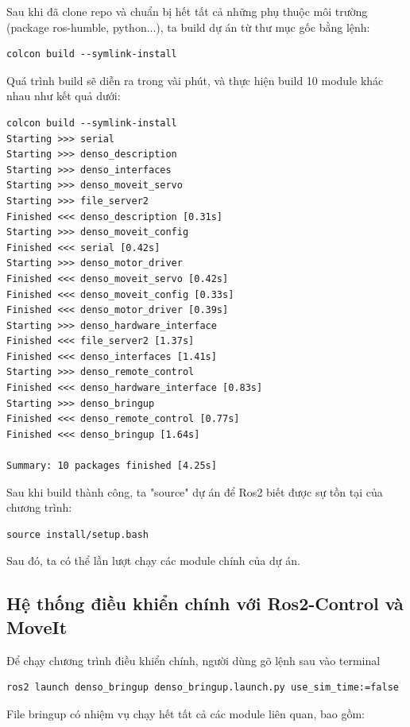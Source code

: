 Sau khi đã clone repo và chuẩn bị hết tất cả những phụ thuộc môi trường (package ros-humble, python...), ta build dự án từ thư mục gốc bằng lệnh:

\begin{lstlisting}[style=bashstyle]
colcon build --symlink-install
\end{lstlisting}

Quá trình build sẽ diễn ra trong vài phút, và thực hiện build 10 module khác nhau như kết quả dưới:

\begin{lstlisting}[style=bashstyle]
colcon build --symlink-install
Starting >>> serial
Starting >>> denso_description
Starting >>> denso_interfaces
Starting >>> denso_moveit_servo
Starting >>> file_server2
Finished <<< denso_description [0.31s]
Starting >>> denso_moveit_config
Finished <<< serial [0.42s]
Starting >>> denso_motor_driver
Finished <<< denso_moveit_servo [0.42s]
Finished <<< denso_moveit_config [0.33s]
Finished <<< denso_motor_driver [0.39s]
Starting >>> denso_hardware_interface
Finished <<< file_server2 [1.37s]
Finished <<< denso_interfaces [1.41s]
Starting >>> denso_remote_control
Finished <<< denso_hardware_interface [0.83s]
Starting >>> denso_bringup
Finished <<< denso_remote_control [0.77s]
Finished <<< denso_bringup [1.64s]

Summary: 10 packages finished [4.25s]
\end{lstlisting}

Sau khi build thành công, ta "source" dự án để Ros2 biết được sự tồn tại của chương trình:

\begin{lstlisting}[style=bashstyle]
source install/setup.bash
\end{lstlisting}

Sau đó, ta có thể lần lượt chạy các module chính của dự án.

\subsection{Hệ thống điều khiển chính với Ros2-Control và MoveIt}

Để chạy chương trình điều khiển chính, người dùng gõ lệnh sau vào terminal

\begin{lstlisting}[style=bashstyle]
ros2 launch denso_bringup denso_bringup.launch.py use_sim_time:=false
\end{lstlisting}

File bringup có nhiệm vụ chạy hết tất cả các module liên quan, bao gồm:


